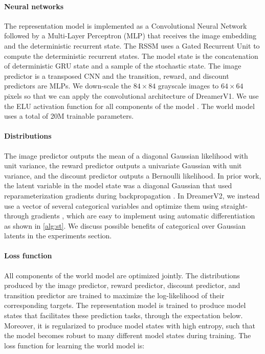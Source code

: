 

\paragraph{Neural networks}

The representation model is implemented as a Convolutional Neural Network \citep[CNN;][]{lecun1989cnn} followed by a Multi-Layer Perceptron (MLP) that receives the image embedding and the deterministic recurrent state. The RSSM uses a Gated Recurrent Unit \citep[GRU;][]{cho2014gru} to compute the deterministic recurrent states. The model state is the concatenation of deterministic GRU state and a sample of the stochastic state. The image predictor is a transposed CNN and the transition, reward, and discount predictors are MLPs. We down-scale the $84 \times 84$ grayscale images to $64 \times 64$ pixels so that we can apply the convolutional architecture of DreamerV1. We use the ELU activation function for all components of the model \citep{clevert2015elu}. The world model uses a total of 20M trainable parameters.



\paragraph{Distributions}

The image predictor outputs the mean of a diagonal Gaussian likelihood with unit variance, the reward predictor outputs a univariate Gaussian with unit variance, and the discount predictor outputs a Bernoulli likelihood. In prior work, the latent variable in the model state was a diagonal Gaussian that used reparameterization gradients during backpropagation \citep{kingma2013vae,rezende2014vae}. In DreamerV2, we instead use a vector of several categorical variables and optimize them using straight-through gradients \citep{bengio2013straight}, which are easy to implement using automatic differentiation as shown in \cref{alg:st}. We discuss possible benefits of categorical over Gaussian latents in the experiments section.

\paragraph{Loss function}

All components of the world model are optimized jointly. The distributions produced by the image predictor, reward predictor, discount predictor, and transition predictor are trained to maximize the log-likelihood of their corresponding targets. The representation model is trained to produce model states that facilitates these prediction tasks, through the expectation below. Moreover, it is regularized to produce model states with high entropy, such that the model becomes robust to many different model states during training. The loss function for learning the world model is:

